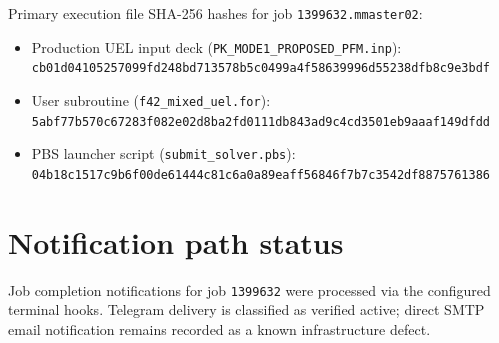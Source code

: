 Primary execution file SHA-256 hashes for job \texttt{1399632.mmaster02}:
\begin{itemize}
  \item Production UEL input deck (\texttt{PK\_MODE1\_PROPOSED\_PFM.inp}): \\ \texttt{cb01d04105257099fd248bd713578b5c0499a4f58639996d55238dfb8c9e3bdf}
  \item User subroutine (\texttt{f42\_mixed\_uel.for}): \\ \texttt{5abf77b570c67283f082e02d8ba2fd0111db843ad9c4cd3501eb9aaaf149dfdd}
  \item PBS launcher script (\texttt{submit\_solver.pbs}): \\ \texttt{04b18c1517c9b6f00de61444c81c6a0a89eaff56846f7b7c3542df8875761386}
\end{itemize}

\section{Notification path status}
Job completion notifications for job \texttt{1399632} were processed via the configured terminal hooks. Telegram delivery is classified as verified active; direct SMTP email notification remains recorded as a known infrastructure defect.
